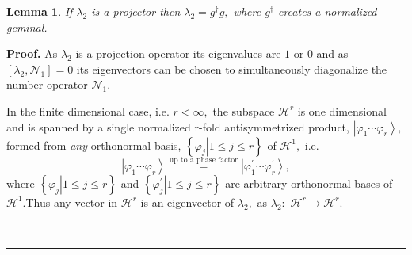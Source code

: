 \documentclass[aps,preprint]{revtex4}%
\newtheorem{lemma}[theorem]{Lemma}
\newenvironment{proof}[1][Proof]{\noindent\textbf{#1.} }{\ \rule{0.5em}{0.5em}}
\begin{document}
\begin{lemma}
If $\lambda_{2}$ is a projector then $\lambda_{2}=g^{\dagger}g,$ where
$g^{\dagger}$ creates a normalized geminal.
\end{lemma}

\begin{proof}
As $\lambda_{2}$ is a projection operator its eigenvalues are $1$ or $0$ and
as $\left[  \lambda_{2},\mathcal{N}_{1}\right]  =0$ its eigenvectors can be
chosen to simultaneously diagonalize the number operator $\mathcal{N}_{1}.$

In the finite dimensional case, i.e. $r<\infty,$ the subspace $\mathcal{H}%
^{r}$ is one dimensional and is spanned by a single normalized r-fold\emph{
}antisymmetrized product, $\left\vert \varphi_{1}\cdots\varphi_{r}%
\right\rangle ,$ formed from \emph{any }orthonormal basis, $\left\{  \left.
\varphi_{j}\right\vert 1\leq j\leq r\right\}  $ of $\mathcal{H}^{1},$ i.e.
\begin{equation}
\left\vert \varphi_{1}\cdots\varphi_{r}\right\rangle \overset{\text{up to a
phase factor}}{=}\left\vert \varphi_{1}^{\prime}\cdots\varphi_{r}^{\prime
}\right\rangle ,
\end{equation}
where $\left\{  \left.  \varphi_{j}\right\vert 1\leq j\leq r\right\}  $ and
$\left\{  \left.  \varphi_{j}^{\prime}\right\vert 1\leq j\leq r\right\}  $ are
arbitrary orthonormal bases of $\mathcal{H}^{1}.$Thus any vector in
$\mathcal{H}^{r}$ is an eigenvector of $\lambda_{2},$ as $\lambda_{2}:$
$\mathcal{H}^{r}\rightarrow\mathcal{H}^{r}$.


\end{proof}
\end{document}
